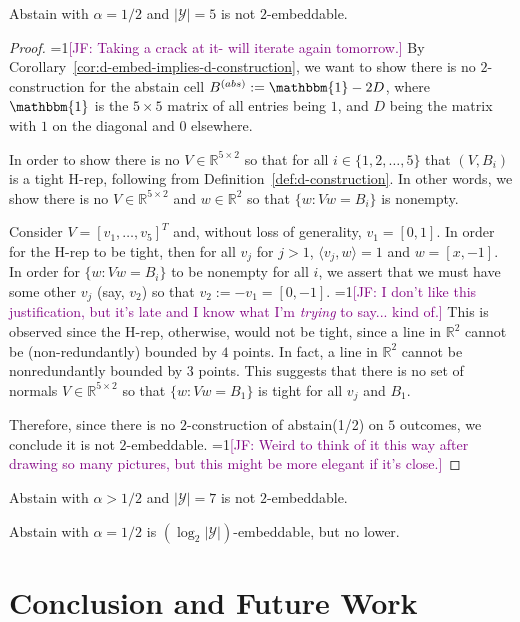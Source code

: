 \documentclass[anon,12pt]{colt2019}
\newcommand{\Comments}{1}
\newcommand{\mynote}[2]{\ifnum\Comments=1\textcolor{#1}{#2}\fi}
\newcommand{\jessie}[1]{\mynote{purple}{[JF: #1]}}
\newcommand{\reals}{\mathbb{R}}
\newcommand{\Y}{\mathcal{Y}}
\newcommand{\ones}{\mathbbm{1}}
\begin{document}
\begin{theorem}
  Abstain with $\alpha=1/2$ and $|\Y|=5$ is not $2$-embeddable.
\end{theorem}
\begin{proof}
\jessie{Taking a crack at it- will iterate again tomorrow.}
By Corollary~\ref{cor:d-embed-implies-d-construction}, we want to show there is no $2$-construction for the abstain cell $B^{(abs)} := \ones - 2D$, where $\ones$ is the $5\times 5$ matrix of all entries being $1$, and $D$ being the matrix with $1$ on the diagonal and $0$ elsewhere.

In order to show there is no $V\in \reals^{5\times 2}$ so that for all $i \in \{1, 2, \ldots, 5\}$ that $(V, B_i)$ is a tight H-rep, following from Definition~\ref{def:d-construction}.
In other words, we show there is no $V \in \reals^{5\times 2}$ and $w \in \reals^2$ so that $\{w : Vw = B_i\}$ is nonempty.

Consider $V = [v_1, \ldots, v_5]^T$ and, without loss of generality, $v_1 = [0,1]$.
In order for the H-rep to be tight, then for all $v_j$ for $j > 1$, $\langle v_j, w \rangle = 1$ and $w = [x, -1]$.
In order for $\{w : Vw = B_i \}$ to be nonempty for all $i$, we assert that we must have some other $v_j$ (say, $v_2$) so that $v_2 := -v_1 = [0, -1]$.
\jessie{I don't like this justification, but it's late and I know what I'm \emph{trying} to say... kind of.}
This is observed since the H-rep, otherwise, would not be tight, since a line in $\reals^2$ cannot be (non-redundantly) bounded by $4$ points.
In fact, a line in $\reals^2$ cannot be nonredundantly bounded by $3$ points.
This suggests that there is no set of normals $V \in \reals^{5\times 2}$ so that $\{w : Vw = B_1\}$ is tight for all $v_j$ and $B_1$.

Therefore, since there is no $2$-construction of abstain(1/2) on $5$ outcomes, we conclude it is not $2$-embeddable.
\jessie{Weird to think of it this way after drawing so many pictures, but this might be more elegant if it's close.}
\end{proof}


\begin{theorem}
  Abstain with $\alpha > 1/2$ and $|\Y|=7$ is not $2$-embeddable.
\end{theorem}

\begin{conjecture}
  Abstain with $\alpha=1/2$ is $(\log_2 |\Y|)$-embeddable, but no lower.
\end{conjecture}

\section{Conclusion and Future Work}
\end{document}
